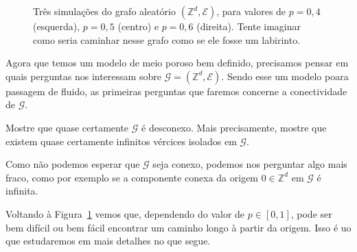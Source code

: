 \begin{topics}
\begin{figure}[!ht]
  \centering
  \caption{Três simulações do grafo aleatório $(\mathbb{Z}^d, \mathcal{E})$, para valores de $p = 0,4$ (esquerda), $p = 0,5$ (centro) e $p = 0,6$ (direita). Tente imaginar como seria caminhar nesse grafo como se ele fosse um labirinto.}
  \label{f:percola}
\end{figure}

Agora que temos um modelo de meio poroso bem definido, precisamos pensar em quais perguntas nos interessam sobre $\mathcal{G} = (\mathbb{Z}^d, \mathcal{E})$.
Sendo esse um modelo poara passagem de fluido, as primeiras perguntas que faremos concerne a conectividade de $\mathcal{G}$.

\begin{exercise}
  Mostre que quase certamente $\mathcal{G}$ é desconexo.
  Mais precisamente, mostre que existem quase certamente infinitos vércices isolados em $\mathcal{G}$.
\end{exercise}

Como não podemos esperar que $\mathcal{G}$ seja conexo, podemos nos perguntar algo mais fraco, como por exemplo se a componente conexa da origem $0 \in \mathbb{Z}^d$ em $\mathcal{G}$ é infinita.

Voltando à Figura~\ref{f:percola} vemos que, dependendo do valor de $p \in [0,1]$, pode ser bem difícil ou bem fácil encontrar um caminho longo à partir da origem.
Isso é uo que estudaremos em mais detalhes no que segue.


\end{topics}
